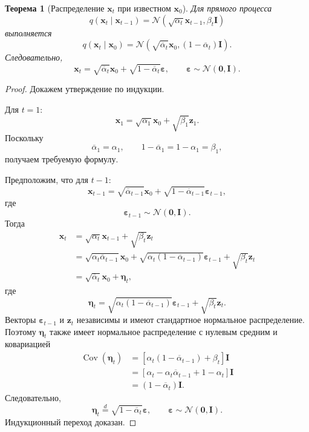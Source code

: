 \documentclass[12pt,a4paper]{article}
\newtheorem{theorem}{Теорема}[section]
\theoremstyle{definition}
\newcommand{\N}{\mathcal{N}}
\newcommand{\Cov}{\operatorname{Cov}}
\newcommand{\eps}{\varepsilon}
\newcommand{\1}{\mathbf{1}}
\begin{document}
\begin{theorem}[Распределение \(\bm{x}_t\) при известном \(\bm{x}_0\)]
Для прямого процесса
\[
    q(\bm{x}_t\mid\bm{x}_{t-1})
    =
    \N\left(
        \sqrt{\alpha_t}\bm{x}_{t-1},
        \beta_t\bm{I}
    \right)
\]
выполняется
\[
    q(\bm{x}_t\mid\bm{x}_0)
    =
    \N\left(
        \sqrt{\overline{\alpha}_t}\bm{x}_0,
        (1-\overline{\alpha}_t)\bm{I}
    \right).
\]
Следовательно,
\[
    \bm{x}_t
    =
    \sqrt{\overline{\alpha}_t}\bm{x}_0
    +
    \sqrt{1-\overline{\alpha}_t}\bm{\eps},
    \qquad
    \bm{\eps}\sim\N(\bm{0},\bm{I}).
\]
\end{theorem}

\begin{proof}
Докажем утверждение по индукции.

Для $t=1$:
\[
    \bm{x}_1
    =
    \sqrt{\alpha_1}\bm{x}_0
    +
    \sqrt{\beta_1}\bm{z}_1.
\]
Поскольку
\[
    \overline{\alpha}_1=\alpha_1,
    \qquad
    1-\overline{\alpha}_1
    =
    1-\alpha_1
    =
    \beta_1,
\]
получаем требуемую формулу.

Предположим, что для $t-1$:
\[
    \bm{x}_{t-1}
    =
    \sqrt{\overline{\alpha}_{t-1}}\bm{x}_0
    +
    \sqrt{1-\overline{\alpha}_{t-1}}\bm{\eps}_{t-1},
\]
где
\[
    \bm{\eps}_{t-1}\sim\N(\bm{0},\bm{I}).
\]
Тогда
\begin{align*}
    \bm{x}_t
    &=
    \sqrt{\alpha_t}\bm{x}_{t-1}
    +
    \sqrt{\beta_t}\bm{z}_t\\
    &=
    \sqrt{\alpha_t\overline{\alpha}_{t-1}}\bm{x}_0
    +
    \sqrt{\alpha_t(1-\overline{\alpha}_{t-1})}
    \bm{\eps}_{t-1}
    +
    \sqrt{\beta_t}\bm{z}_t\\
    &=
    \sqrt{\overline{\alpha}_t}\bm{x}_0
    +
    \bm{\eta}_t,
\end{align*}
где
\[
    \bm{\eta}_t
    =
    \sqrt{\alpha_t(1-\overline{\alpha}_{t-1})}
    \bm{\eps}_{t-1}
    +
    \sqrt{\beta_t}\bm{z}_t.
\]
Векторы $\bm{\eps}_{t-1}$ и $\bm{z}_t$ независимы и имеют стандартное
нормальное распределение. Поэтому $\bm{\eta}_t$ также имеет нормальное
распределение с нулевым средним и ковариацией
\begin{align*}
    \Cov(\bm{\eta}_t)
    &=
    \left[
        \alpha_t(1-\overline{\alpha}_{t-1})
        +
        \beta_t
    \right]\bm{I}\\
    &=
    \left[
        \alpha_t
        -
        \alpha_t\overline{\alpha}_{t-1}
        +
        1-\alpha_t
    \right]\bm{I}\\
    &=
    (1-\overline{\alpha}_t)\bm{I}.
\end{align*}
Следовательно,
\[
    \bm{\eta}_t
    \overset{d}{=}
    \sqrt{1-\overline{\alpha}_t}\bm{\eps},
    \qquad
    \bm{\eps}\sim\N(\bm{0},\bm{I}).
\]
Индукционный переход доказан.
\end{proof}
\end{document}
